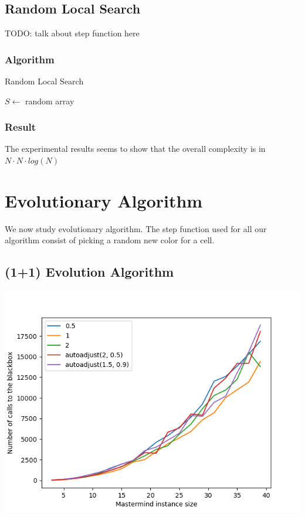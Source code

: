 \documentclass[12pt]{article}
\theoremstyle{definition}
\theoremstyle{plain}
\theoremstyle{remark}
\begin{document}
\subsection{Random Local Search}

TODO: talk about step function here

\subsubsection{Algorithm}
\begin{algorithm}[H]
	\caption{Random Local Search}
	$S \leftarrow$ random array
\end{algorithm}
\subsubsection{Result}


The experimental results seems to show that the overall complexity is in $N \cdot N \cdot log(N)$

\section{Evolutionary Algorithm}
We now study evolutionary algorithm.
The step function used for all our algorithm consist of picking a random new color for a cell.

\subsection{(1+1) Evolution Algorithm}

\includegraphics{rate.png}
\end{document}
